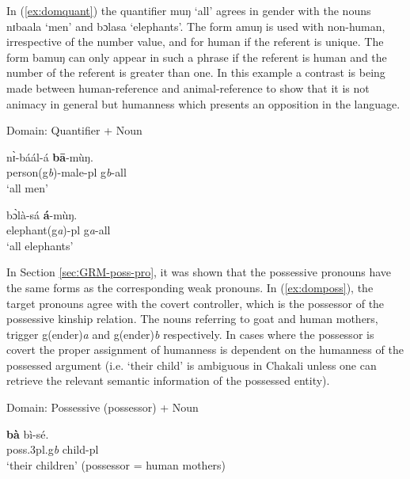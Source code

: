 \begin{exe}
\begin{exe}
\begin{exe}
{\begin{exe}
\begin{exe}
\begin{exe}
\begin{exe}
\begin{exe}
\begin{exe}
\begin{exe}
\begin{exe}
\begin{exe}
\begin{exe}
\begin{exe}
\begin{exe}
\begin{exe}
\begin{exe}
\begin{exe}
\begin{exe}
\begin{exe}
\begin{exe}
\begin{exe}
In (\ref{ex:domquant}) the quantifier {\sls muŋ} `all'
agrees in gender with the nouns {\sls nɪbaala} `men' and
{\sls bɔlasa} `elephants'.  The form {\sls amuŋ} is
used with non-human, irrespective of the number value, and for human if
the referent is unique. The form  {\sls bamuŋ} can only  appear in such a phrase
if the referent is human and the number of the referent is greater than one. In
this example a contrast is being made between
human-reference and animal-reference to show that it is not animacy in general 
but
humanness
which presents an opposition in the language.


\ea\label{ex:domquant}{\rm Domain: Quantifier + Noun}\\


\ea\label{ex:domquantH+}

\gll   nɪ̀-báál-á  \textbf{bā}-mùŋ.\\
    {person({\sc g}{\it b})-male-{\sc pl}} {\sc g}{\it b}-{\sc all}\\
\glt `all men'\\

\ex\label{ex:domquantH-}

\gll   bɔ̀là-sá  \textbf{á}-mùŋ.\\
  {elephant({\sc g}{\it a})-{\sc pl}}  {\sc g}{\it a}-{\sc all}\\
\glt `all elephants'\\


\z 
 \z

In Section \ref{secːGRM-poss-pro}, it was shown   that the possessive pronouns
have the same forms as
the corresponding weak
pronouns.  In
(\ref{ex:domposs}),  the target pronouns agree with the covert
controller, which is the possessor of the possessive kinship relation.
The nouns referring to goat and human mothers, trigger
{\sc g(ender)}{\it a} and {\sc g(ender)}{\it b} respectively. In cases where 
the possessor is covert the proper
assignment of humanness is dependent on the humanness of the possessed
argument (i.e. `their child' is ambiguous in Chakali unless one can 
retrieve the relevant semantic  information of the possessed entity).

\ea\label{ex:domposs}{\rm Domain: Possessive (possessor) + Noun}\\


\ea\label{ex:dompossH+}

\gll  \textbf{bà}   bì-sé.\\
     {\sc poss.3pl.g}{\it b}
{child-{\sc pl}}\\
\glt `their children' (possessor = human mothers) 


\end{exe}
\end{exe}
\end{exe}
\end{exe}
\end{exe}
\end{exe}
\end{exe}
\end{exe}
\end{exe}
\end{exe}
\end{exe}
\end{exe}
\end{exe}
\end{exe}
\end{exe}
\end{exe}
\end{exe}
\end{exe}
\end{exe}}
\end{exe}
\end{exe}
\end{exe}

